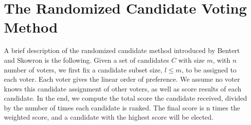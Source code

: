 \documentclass[letterpaper]{article} %
\begin{document}
\section{The Randomized Candidate Voting Method} 
\label{Algorithm}
A brief description of the randomized candidate method introduced by Bentert and Skowron is the following. Given a set of candidates $C$ with size $m$, with $n$ number of voters, we first fix a candidate subset size, $l \le m$, to be assigned to each voter. Each voter gives the linear order of preference. We assume no voter knows this candidate assignment of other voters, as well as score results of each candidate. In the end, we compute the total score the candidate received, divided by the number of times each candidate is ranked. The final score is n times the weighted score, and a candidate with the highest score will be elected.
\end{document}
